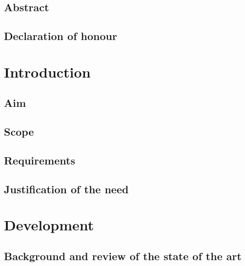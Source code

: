 \documentclass[11pt, a4paper, twoside]{book}
\begin{document}




\section*{Abstract}

\newpage

\section*{Declaration of honour}

\newpage


\tableofcontents
\listoffigures
\listoftables
\newpage

\printunsrtglossary[type=symbols,style=symbunitlong]





\chapter{Introduction}

	\section{Aim}
	
	\section{Scope}
	
	\section{Requirements}
	
	\section{Justification of the need}


\chapter{Development}

	\section{Background and review of the state of the art}
	
\end{document}
